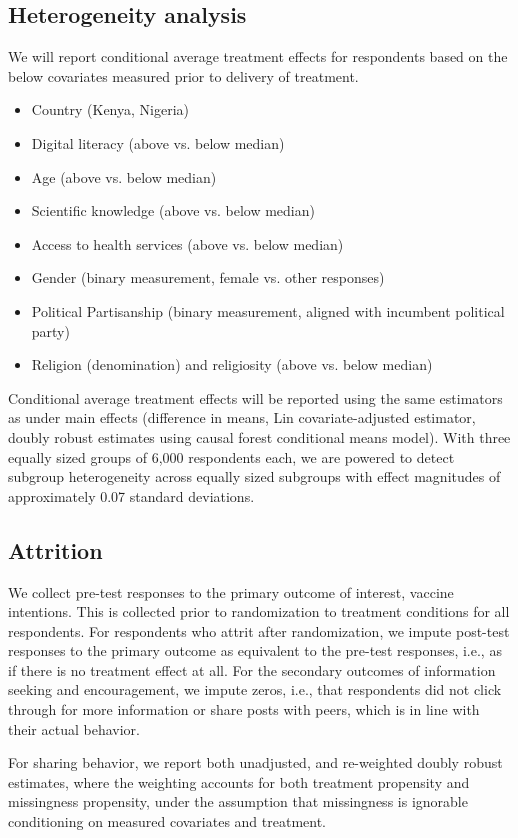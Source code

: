 \documentclass[letterpaper, 12pt, parskip=full,DIV=10]{scrartcl}
\begin{document}
\subsection{Heterogeneity analysis}
We will report conditional average treatment effects for respondents based on the below covariates measured prior to delivery of treatment. 
\begin{itemize}[noitemsep, topsep=0pt]
\item Country (Kenya, Nigeria)
\item Digital literacy (above vs. below median)
\item Age (above vs. below median)
\item Scientific knowledge (above vs. below median)
\item Access to health services (above vs. below median)
\item Gender (binary measurement, female vs. other responses)
\item Political Partisanship (binary measurement, aligned with incumbent political party)
\item Religion (denomination) and religiosity (above vs. below median)
\end{itemize}

Conditional average treatment effects will be reported using the same estimators as under main effects (difference in means, Lin covariate-adjusted estimator, doubly robust estimates using causal forest conditional means model). With three equally sized groups of 6,000 respondents each, we are powered to detect subgroup heterogeneity across equally sized subgroups with effect magnitudes of approximately 0.07 standard deviations. 

\subsection{Attrition}
We collect pre-test responses to the primary outcome of interest, vaccine intentions. This is collected prior to randomization to treatment conditions for all respondents. For respondents who attrit after randomization, we impute post-test responses to the primary outcome as equivalent to the pre-test responses, i.e., as if there is no treatment effect at all. For the secondary outcomes of information seeking and encouragement, we impute zeros, i.e., that respondents did not click through for more information or share posts with peers, which is in line with their actual behavior. 

For sharing behavior, we report both unadjusted, and re-weighted doubly robust estimates, where the weighting accounts for both treatment propensity and missingness propensity, under the assumption that missingness is ignorable conditioning on measured covariates and treatment. 
\end{document}

